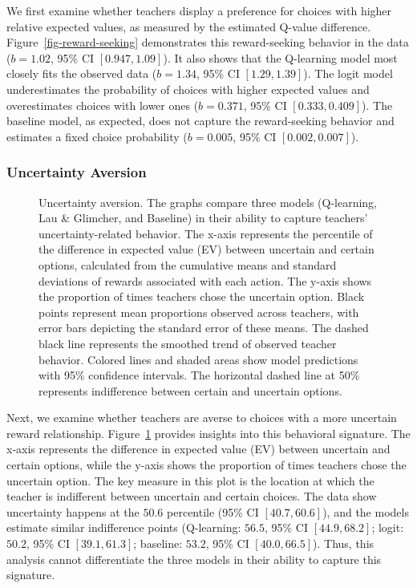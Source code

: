 \documentclass[
  number,
  preprint,
  3p,
  onecolumn]{elsarticle}
\begin{document}
We first examine whether teachers display a preference for choices with
higher relative expected values, as measured by the estimated Q-value
difference. Figure~\ref{fig-reward-seeking} demonstrates this
reward-seeking behavior in the data (\(b = 1.02\), 95\% CI
\([0.947, 1.09]\)). It also shows that the Q-learning model most closely
fits the observed data (\(b = 1.34\), 95\% CI \([1.29, 1.39]\)). The
logit model underestimates the probability of choices with higher
expected values and overestimates choices with lower ones
(\(b = 0.371\), 95\% CI \([0.333,0.409]\)). The baseline model, as
expected, does not capture the reward-seeking behavior and estimates a
fixed choice probability (\(b = 0.005\), 95\% CI \([0.002,0.007]\)).

\subsubsection{Uncertainty Aversion}\label{uncertainty-aversion}

\begin{figure}


\caption{\label{fig-uncertainty-aversion}Uncertainty aversion. The
graphs compare three models (Q-learning, Lau \& Glimcher, and Baseline)
in their ability to capture teachers' uncertainty-related behavior. The
x-axis represents the percentile of the difference in expected value
(EV) between uncertain and certain options, calculated from the
cumulative means and standard deviations of rewards associated with each
action. The y-axis shows the proportion of times teachers chose the
uncertain option. Black points represent mean proportions observed
across teachers, with error bars depicting the standard error of these
means. The dashed black line represents the smoothed trend of observed
teacher behavior. Colored lines and shaded areas show model predictions
with 95\% confidence intervals. The horizontal dashed line at 50\%
represents indifference between certain and uncertain options.}

\end{figure}%

Next, we examine whether teachers are averse to choices with a more
uncertain reward relationship. Figure~\ref{fig-uncertainty-aversion}
provides insights into this behavioral signature. The x-axis represents
the difference in expected value (EV) between uncertain and certain
options, while the y-axis shows the proportion of times teachers chose
the uncertain option. The key measure in this plot is the location at
which the teacher is indifferent between uncertain and certain choices.
The data show uncertainty happens at the \(50.6\) percentile (95\% CI
\([40.7,60.6]\)), and the models estimate similar indifference points
(Q-learning: \(56.5\), 95\% CI \([44.9, 68.2]\); logit: \(50.2\), 95\%
CI \([39.1, 61.3]\); baseline: \(53.2\), 95\% CI \([40.0, 66.5]\)).
Thus, this analysis cannot differentiate the three models in their
ability to capture this signature.
\end{document}
